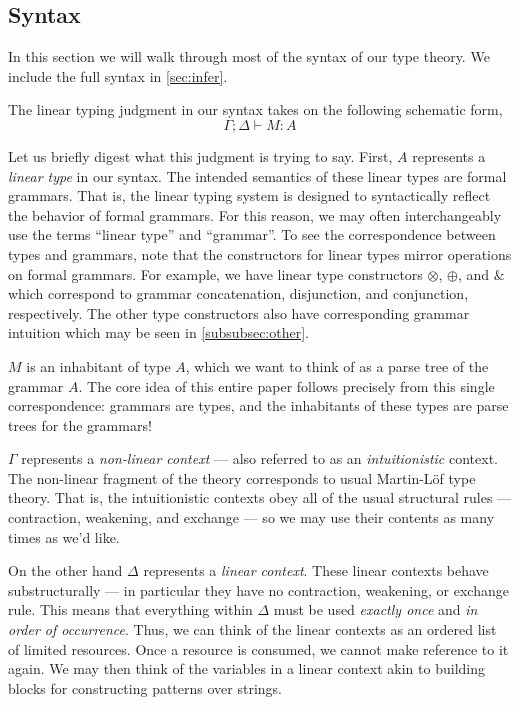 \documentclass[acmsmall,screen,nonacm]{acmart}
\newcommand{\amp}{\mathrel{\&}}
\begin{document}
\subsection{Syntax}
\label{subsec:syntax}

In this section we will walk through most of the syntax of our type theory. We
include the full syntax in \cref{sec:infer}.

The linear typing judgment in our syntax takes on the following schematic form,
\[
  \Gamma ; \Delta \vdash M : A
\]

Let us briefly digest what this judgment is trying to say. First, $A$ represents
a \emph{linear type} in our syntax. The intended semantics of these linear types
are formal grammars. That is, the linear typing system is designed to syntactically
reflect the behavior of formal grammars. For this reason, we may often
interchangeably use the terms ``linear type'' and ``grammar''. To see the
correspondence between types and grammars, note that the constructors for linear types
mirror operations on formal grammars. For example, we have linear type constructors
$\otimes$, $\oplus$, and $\amp$ which correspond to grammar concatenation,
disjunction, and conjunction, respectively. The other type constructors also have
corresponding grammar intuition which may be seen in \cref{subsubsec:other}.

$M$ is an inhabitant of type $A$, which we want to think of as a parse tree of
the grammar $A$. The core idea of this entire paper follows precisely from this
single correspondence: grammars are types, and the inhabitants of these types
are parse trees for the grammars!

$\Gamma$ represents a \emph{non-linear context} --- also referred to as an
\emph{intuitionistic} context. The non-linear fragment of the theory
corresponds to usual Martin-L\"of type theory. That is, the intuitionistic
contexts obey all of the usual structural rules --- contraction, weakening, and
exchange --- so we may use their contents as many times as we'd like.

On the other hand $\Delta$ represents a \emph{linear context}. These linear
contexts
behave substructurally --- in particular they have no contraction, weakening, or exchange
rule. This means that everything within $\Delta$ must be used \emph{exactly
  once} and \emph{in order of occurrence}. Thus, we can think of the linear
contexts as an ordered list of limited
resources. Once a resource is consumed, we cannot make reference to it again.
We may then
think of the variables in a linear context akin to building blocks for
constructing patterns over strings.
\end{document}

